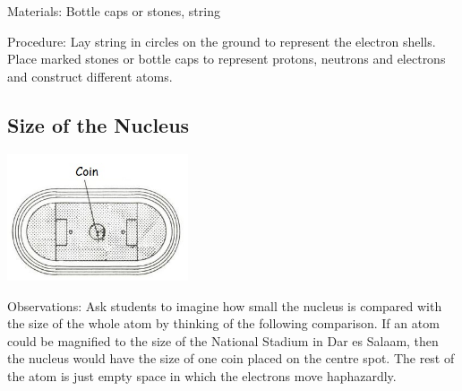 \begin{multicols}{2}
\begin{description*}
\item[Materials:]{Bottle caps or stones, string}
\item[Procedure:]{Lay string in circles on the ground to represent the electron shells. Place marked stones or bottle caps to represent protons, neutrons and electrons and construct different atoms.}
\end{description*}

\subsection{Size of the Nucleus}

\begin{center}
\includegraphics[width=0.4\textwidth]{./img/source/size-nucleus.jpg}
\end{center}

\begin{description*}
\item[Observations:]{Ask students to imagine how small the
nucleus is compared with the size of the whole
atom by thinking of the following comparison.
If an atom could be magnified to the size of the
National Stadium in Dar es Salaam, then the
nucleus would have the size of one coin
placed on the centre spot. The rest of the atom is
just empty space in which the electrons move
haphazardly.}
\end{description*}


\end{multicols}
